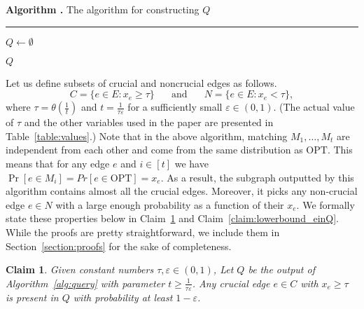 \documentclass[letterpaper,11pt]{article}
\renewcommand{\epsilon}{\varepsilon}
\newcommand{\opt}[0]{\text{OPT}}
\renewcommand{\epsilon}[0]{\ensuremath{\varepsilon}}
\newtheorem{claim}[lemma]{Claim}
\newcounter{myalgctr}
\newenvironment{tbox}{
\par\addvspace{0.2cm}
\begin{tcolorbox}[width=\textwidth,
boxsep=2pt,
                  left=1pt,
                  right=1pt,
                  top=4pt,
                  boxrule=1pt,
                  arc=0pt,
                  colback=white,
                  colframe=black
                  ]}{
\end{tcolorbox}
}
\newcommand{\tboxhrule}[0]{\vspace{0.1cm} \hrule \vspace{0.2cm}}
\newenvironment{titledtbox}[1]{\begin{tbox}#1 \tboxhrule}{\end{tbox}}
\newenvironment{tboxalg2e}[1]{
\refstepcounter{myalgctr}
	\begin{titledtbox}{\textbf{Algorithm \themyalgctr.} #1}
	\vspace{-0.2cm}
}
{
	\vspace{-0.3cm}
	\end{titledtbox}
}
\begin{document}
	
\begin{tboxalg2e}{The algorithm for constructing $Q$}
\begin{algorithm}[H]
	\DontPrintSemicolon
	\SetAlgoInsideSkip{}
	
	\label{alg:query}
        $Q \gets \emptyset$ \\
	
	\Return $Q$
\end{algorithm}
\end{tboxalg2e}
\vspace{2 mm}
Let us define subsets of crucial and noncrucial edges as follows.
\begin{equation}\label{eq:crucialnoncrucial}
    C = \{ e \in E : x_e \geq \tau \} \;\;\;\;\;\text{ and } \;\;\;\;\; N = \{ e \in E : x_e < \tau \},
\end{equation} where 
$\tau=\theta(\frac{1}{t})$ and $t= \frac{1}{\tau \epsilon}$ for a sufficiently small $\epsilon\in (0,1)$. (The actual value of $\tau$ and the other variables used in the paper are presented in Table~\ref{table:values}.)
Note that in the above algorithm, matching $M_1, \dots, M_t$ are independent from each other and come from the same distribution as $\opt$. This means that for any edge $e$ and $i\in [t]$ we have $\Pr[e\in M_i] = Pr[e\in  \opt] = x_e$. As a result, the subgraph outputted by this algorithm contains almost all the crucial edges. Moreover, it  picks any non-crucial edge $e\in  N$ with a large enough probability as a function of their $x_e$.  We formally state these properties below in  Claim~\ref{claim:allcrucial} and Claim~\ref{claim:lowerbound_einQ}. While the proofs are pretty straightforward, we include them in Section~\ref{section:proofs} for the sake of completeness.

\newcommand{\claimallcrucial}[0]{Given constant numbers  $\tau, \epsilon \in (0,1)$, Let $Q$ be the output of Algorithm~\ref{alg:query} with parameter $t\geq \frac{1}{\tau \epsilon}$.  Any crucial edge $e\in C$ with $x_e \geq  \tau$  is present in $Q$ with probability at least $1-\epsilon$. }
\begin{claim}\label{claim:allcrucial}
\claimallcrucial{}
\end{claim}

\newcommand{\claimlowerboundeinQ}[0]{Any edge  $e\in  E$ is present in $Q$ with probability at least $\min(1/3,  tx_e/3).$}
\end{document}
